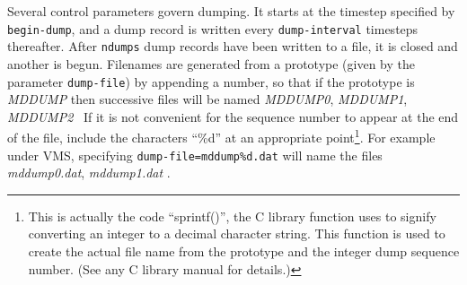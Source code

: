Several control parameters govern dumping. It starts at the timestep
specified by \verb'begin-dump', and a dump record is written every
\verb'dump-interval' timesteps thereafter.  After \verb'ndumps' dump
records have been written to a file, it is closed and another is
begun. Filenames are generated from a prototype (given by the
parameter \verb'dump-file') by appending a number, so that if the
prototype is {\em MDDUMP\/} then successive files will be named
{\em MDDUMP0}, {\em MDDUMP1}, {\em MDDUMP2} \etc\
If it is not convenient for the sequence number to appear at the end
of the file, include the characters ``\%d'' at an appropriate
point\footnote{This is actually the code ``sprintf()'', the C library
function uses to signify converting an integer to a decimal character
string. This function is used to create the actual file name from the
prototype and the integer dump sequence number. (See any C library
manual for details.)}.  For example under VMS, specifying
\verb'dump-file=mddump%d.dat' will name the files {\em mddump0.dat},
{\em mddump1.dat\/} \etc.

